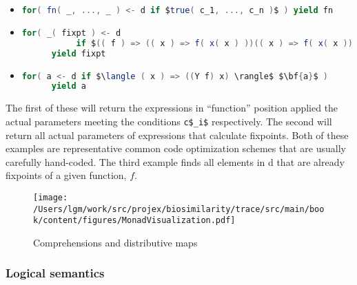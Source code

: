 \begin{itemize}
  \item \begin{lstlisting}[language=Scala,mathescape=true]
      for( fn( _, ..., _ ) <- d if $true( c_1, ..., c_n )$ ) yield fn
    \end{lstlisting}

  \item \begin{lstlisting}[language=Scala,mathescape=true]
      for( _( fixpt ) <- d
           if $(( f ) => (( x ) => f( x( x ) ))(( x ) => f( x( x ))))( true )$ )
      yield fixpt
    \end{lstlisting}
  \item \begin{lstlisting}[language=Scala,mathescape=true]
      for( a <- d if $\langle ( x ) => ((Y f) x) \rangle$ $\bf{a}$ )
      yield a
    \end{lstlisting}
\end{itemize}

The first of these will return the expressions in ``function''
position applied the actual parameters meeting the conditions
\lstinline[language=Scala,mathescape=true]!c$_i$! respectively. The
second will return all actual parameters of expressions that calculate
fixpoints. Both of these examples are representative common code
optimization schemes that are usually carefully hand-coded. The third
example finds all elements in d that are already fixpoints of a given
function, $f$.

\begin{figure}[tbp]
\begin{center}
{ \texttt{[image: /Users/lgm/work/src/projex/biosimilarity/trace/src/main/book/content/figures/MonadVisualization.pdf]} }
\caption{ Comprehensions and distributive maps }
\end{center}
\end{figure}


\subsubsection{Logical semantics}

